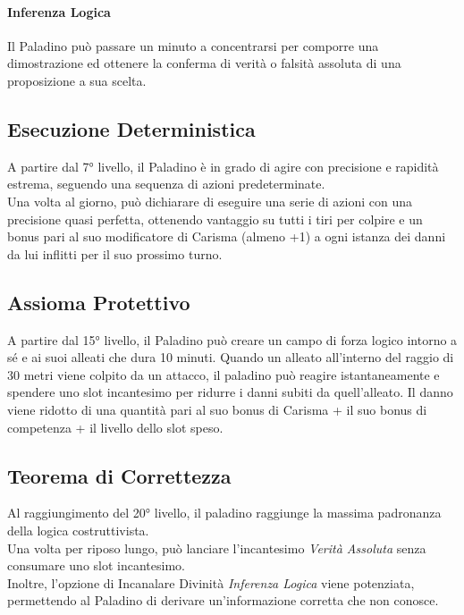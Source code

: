 \paragraph{Inferenza Logica} Il Paladino può passare un minuto a concentrarsi per comporre una dimostrazione ed ottenere la conferma di verità o falsità assoluta di una proposizione a sua scelta.

\subsection{Esecuzione Deterministica}
A partire dal 7° livello, il Paladino è in grado di agire con precisione e rapidità estrema, seguendo una sequenza di azioni predeterminate. \\ Una volta al giorno, può dichiarare di eseguire una serie di azioni con una precisione quasi perfetta, ottenendo vantaggio su tutti i tiri per colpire e un bonus pari al suo modificatore di Carisma (almeno +1) a ogni istanza dei danni da lui inflitti per il suo prossimo turno.

\subsection{Assioma Protettivo}
A partire dal 15° livello, il Paladino può creare un campo di forza logico intorno a sé e ai suoi alleati che dura 10 minuti. Quando un alleato all'interno del raggio di 30 metri viene colpito da un attacco, il paladino può reagire istantaneamente e spendere uno slot incantesimo per ridurre i danni subiti da quell'alleato. Il danno viene ridotto di una quantità pari al suo bonus di Carisma + il suo bonus di competenza + il livello dello slot speso.

\subsection{Teorema di Correttezza}
Al raggiungimento del 20° livello, il paladino raggiunge la massima padronanza della logica costruttivista. \\ Una volta per riposo lungo, può lanciare l'incantesimo \textit{Verità Assoluta} senza consumare uno slot incantesimo. \\ Inoltre, l'opzione di Incanalare Divinità \textit{Inferenza Logica} viene potenziata, permettendo al Paladino di derivare un'informazione corretta che non conosce.